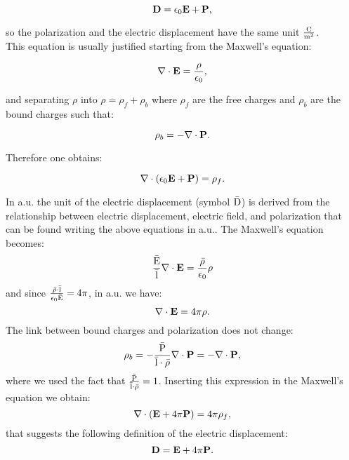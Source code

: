\documentclass[12pt,a4paper,twoside]{report}
\begin{document}
{\begin{tcolorbox}
\begin{equation}
{\bf D}=\epsilon_0 {\bf E} + {\bf P},
\label{eldisp}
\end{equation}
\end{tcolorbox}

so the polarization and the electric displacement have the same
unit ${{\rm C} \over {\rm m}^2}$. \\
This equation is usually justified starting from
the Maxwell's equation:

\begin{tcolorbox}
\begin{equation}
\nabla \cdot {\bf E} = {\rho \over \epsilon_0},
\end{equation}
\end{tcolorbox}

and separating $\rho$ into $\rho=\rho_f + \rho_b$ where
$\rho_f$ are the free charges and $\rho_b$ are the 
bound charges such that:

\begin{tcolorbox}
\begin{equation}
\rho_b=-\nabla \cdot {\bf P}.
\end{equation}
\end{tcolorbox}

Therefore one obtains:

\begin{tcolorbox}
\begin{equation}
\nabla \cdot (\epsilon_0 {\bf E}+ {\bf P})=\rho_f. 
\end{equation}
\end{tcolorbox}

{\color{web-blue} In a.u. the unit of the electric displacement 
(symbol ${\rm \bar D}$) is derived from the 
relationship between electric displacement, electric field, and polarization
that can be found writing the above equations in a.u.. The Maxwell's
equation becomes:
\begin{equation}
{{\rm \bar E} \over {\rm \bar l}} \nabla \cdot {\bf E} = {{\rm \bar \rho} \over \epsilon_0}
\rho
\label{maxwell1gen}
\end{equation}
and since ${{\rm \bar \rho}\cdot {\rm  \bar l} \over \epsilon_0 {\rm \bar E}}=4\pi$, in a.u. we have:
\begin{equation}
\nabla \cdot {\bf E} = 4 \pi \rho.
\end{equation}
The link between bound charges and polarization does not change:
\begin{equation}
\rho_b = -{{\rm \bar P} \over {\rm \bar l} \cdot {\rm \bar \rho}} \nabla \cdot {\bf P}=
-\nabla \cdot {\bf P},
\end{equation}
where we used the fact that ${{\rm \bar P} \over {\rm \bar l}\cdot {\rm \bar \rho}}=1$.
Inserting this expression in the Maxwell's equation we obtain:
\begin{equation}
\nabla \cdot ({\bf E}+ 4 \pi {\bf P})=4 \pi \rho_f, 
\end{equation}
that suggests the following definition of the electric displacement:
\begin{equation}
{\bf D}={\bf E} + 4\pi {\bf P}.
\label{eldispau}
\end{equation}

}}
\end{document}
